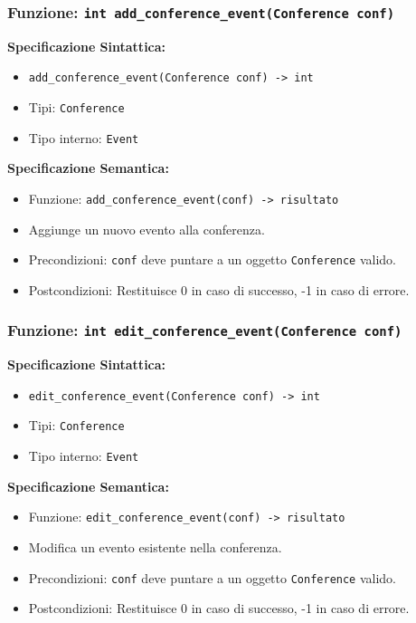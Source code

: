 \documentclass[11pt]{scrartcl} %
\begin{document}
\subsubsection{Funzione: \texttt{int
add\_conference\_event(Conference conf)}}

\textbf{Specificazione Sintattica:}
\begin{itemize}
\item \texttt{add\_conference\_event(Conference conf) -> int}
\item Tipi: \texttt{Conference}
\item Tipo interno: \texttt{Event}
\end{itemize}

\textbf{Specificazione Semantica:}
\begin{itemize}
\item Funzione: \texttt{add\_conference\_event(conf) -> risultato}
\item Aggiunge un nuovo evento alla conferenza.
\item Precondizioni: \texttt{conf} deve puntare a un oggetto \texttt{Conference} valido.
\item Postcondizioni: Restituisce 0 in caso di successo, -1 in caso di errore.
\end{itemize}

\subsubsection{Funzione: \texttt{int edit\_conference\_event(Conference conf)}}

\textbf{Specificazione Sintattica:}
\begin{itemize}
\item \texttt{edit\_conference\_event(Conference conf) -> int}
\item Tipi: \texttt{Conference}
\item Tipo interno: \texttt{Event}
\end{itemize}

\textbf{Specificazione Semantica:}
\begin{itemize}
\item Funzione: \texttt{edit\_conference\_event(conf) -> risultato}
\item Modifica un evento esistente nella conferenza.
\item Precondizioni: \texttt{conf} deve puntare a un oggetto \texttt{Conference} valido.
\item Postcondizioni: Restituisce 0 in caso di successo, -1 in caso di errore.
\end{itemize}
\end{document}

